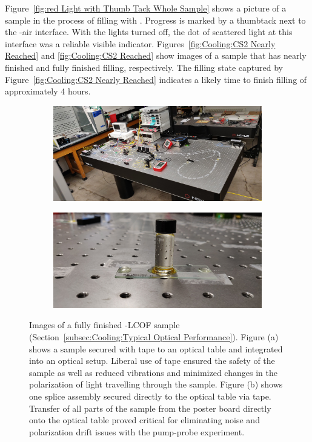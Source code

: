 Figure~\ref{fig:red Light with Thumb Tack Whole Sample} shows a picture of a sample in the process of filling with . Progress is marked by a thumbtack next to the -air interface. With the lights turned off, the dot of scattered light at this interface was a reliable visible indicator. Figures~\ref{fig:Cooling:CS2 Nearly Reached} and \ref{fig:Cooling:CS2 Reached} show images of a sample that has nearly finished and fully finished filling, respectively. The filling state captured by Figure~\ref{fig:Cooling:CS2 Nearly Reached} indicates a likely time to finish filling of approximately 4 hours.

\begin{figure}[t]
    \centering
    \begin{subfigure}[b]{0.49\textwidth}
        \centering
        \includegraphics[width=\textwidth]{figs/3-Cooling/fullSampleTapedToOpticalTable.jpg}
        \caption{}
        \label{fig:Cooling:Full Sample Taped on Table}
    \end{subfigure}
    \hfill
    \begin{subfigure}[b]{0.49\textwidth}
        \centering
        \includegraphics[width=\textwidth]{figs/3-Cooling/spliceTapedDirectlyOnOpticalTable.jpg}
        \caption{}
        \label{fig:Cooling:Splice Taped on Table}
    \end{subfigure}
    \caption{Images of a fully finished -\ac{LCOF} sample (Section~\ref{subsec:Cooling:Typical Optical Performance}). Figure (a) shows a sample secured with tape to an optical table and integrated into an optical setup. Liberal use of tape ensured the safety of the sample as well as reduced vibrations and minimized changes in the polarization of light travelling through the sample. Figure (b) shows one splice assembly secured directly to the optical table via tape. Transfer of all parts of the sample from the poster board directly onto the optical table proved critical for eliminating noise and polarization drift issues with the pump-probe experiment.}

\end{figure}
